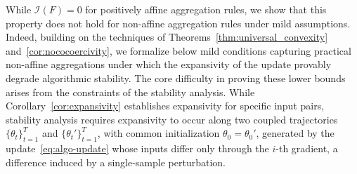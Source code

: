 \documentclass[twoside,11pt]{article}
\makeatletter
\newcommand{\R}{\mathbb{R}}
\let\save@mathaccent\mathaccent
\newcommand*\if@single[3]{%
  \setbox0\hbox{${\mathaccent"0362{#1}}^H$}%
  \setbox2\hbox{${\mathaccent"0362{\kern0pt#1}}^H$}%
  \ifdim\ht0=\ht2 #3\else #2\fi
  }
\newcommand*\rel@kern[1]{\kern#1\dimexpr\macc@kerna}
\newcommand*\widebar[1]{\@ifnextchar^{{\wide@bar{#1}{0}}}{\wide@bar{#1}{1}}}
\newcommand*\wide@bar[2]{\if@single{#1}{\wide@bar@{#1}{#2}{1}}{\wide@bar@{#1}{#2}{2}}}
\newcommand*\wide@bar@[3]{%
  \begingroup
  \def\mathaccent##1##2{%
    \let\mathaccent\save@mathaccent
    \if#32 \let\macc@nucleus\first@char \fi
    \setbox\z@\hbox{$\macc@style{\macc@nucleus}_{}$}%
    \setbox\tw@\hbox{$\macc@style{\macc@nucleus}{}_{}$}%
    \dimen@\wd\tw@
    \advance\dimen@-\wd\z@
    \divide\dimen@ 3
    \@tempdima\wd\tw@
    \advance\@tempdima-\scriptspace
    \divide\@tempdima 10
    \advance\dimen@-\@tempdima
    \ifdim\dimen@>\z@ \dimen@0pt\fi
    \rel@kern{0.6}\kern-\dimen@
    \if#31
      \overline{\rel@kern{-0.6}\kern\dimen@\macc@nucleus\rel@kern{0.4}\kern\dimen@}%
      \advance\dimen@0.4\dimexpr\macc@kerna
      \let\final@kern#2%
      \ifdim\dimen@<\z@ \let\final@kern1\fi
      \if\final@kern1 \kern-\dimen@\fi
    \else
      \overline{\rel@kern{-0.6}\kern\dimen@#1}%
    \fi
  }%
  \macc@depth\@ne
  \let\math@bgroup\@empty \let\math@egroup\macc@set@skewchar
  \mathsurround\z@ \frozen@everymath{\mathgroup\macc@group\relax}%
  \macc@set@skewchar\relax
  \let\mathaccentV\macc@nested@a
  \if#31
    \macc@nested@a\relax111{#1}%
  \else
    \def\gobble@till@marker##1\endmarker{}%
    \futurelet\first@char\gobble@till@marker#1\endmarker
    \ifcat\noexpand\first@char A\else
      \def\first@char{}%
    \fi
    \macc@nested@a\relax111{\first@char}%
  \fi
  \endgroup
}
\makeatother
\begin{document}


\noindent While $\mathcal{I}(F) = 0$ for positively affine aggregation rules, we show that this property does not hold for non-affine aggregation rules under mild assumptions.
Indeed, building on the techniques of Theorems~\ref{thm:universal_convexity} and~\ref{cor:nococoercivity}, we formalize below mild conditions capturing practical non-affine aggregations under which the expansivity of the update provably degrade algorithmic stability.
The core difficulty in proving these lower bounds arises from the constraints of the stability analysis. 
While Corollary~\ref{cor:expansivity} establishes expansivity for specific input pairs, stability analysis requires expansivity to occur along two coupled trajectories $\{\theta_t\}_{t=1}^T$ and $\{\theta_t'\}_{t=1}^T$, with common initialization $\theta_0=\theta_0'$, 
generated by the update~\eqref{eq:algo-update} whose inputs differ only through the $i$-th gradient, a difference induced by a single-sample perturbation.
\end{document}
